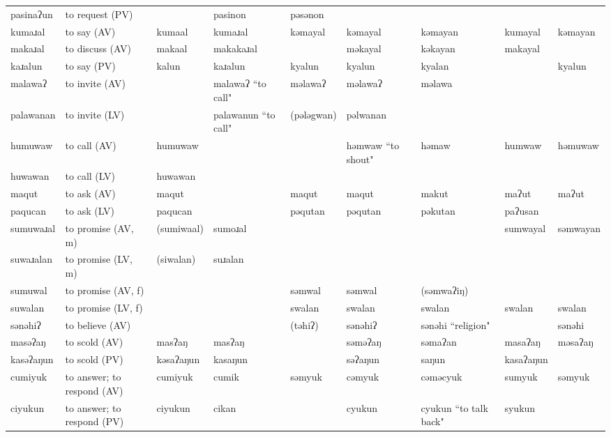 \begin{landscape}
\begin{longtable}{*{9}{>{\raggedright\arraybackslash}p{}}}
\text{*}pasinaʔun & to request (PV) &  & pasinon & pəsənon &  &  &  & \\
\text{*}kumaɹal & to say (AV) & kumaal & kumaɹal & kəmayal & kəmayal & kəmayan & kumayal & kəmayan\\
\text{*}makaɹal & to discuss (AV) & makaal & makakaɹal &  & məkayal & kəkayan & makayal & \\
\text{*}kaɹalun & to say (PV) & kalun & kaɹalun & kyalun & kyalun & kyalan &  & kyalun\\
\text{*}malawaʔ & to invite (AV) &  & malawaʔ \newline ``to call" & məlawaʔ & məlawaʔ & məlawa &  & \\
\text{*}palawanan & to invite (LV) &  & palawanun ``to call" & (pələgwan) & pəlwanan &  &  & \\
\text{*}humuwaw & to call (AV) & humuwaw &  &  & həmwaw \newline ``to shout" & həmaw & humwaw & həmuwaw\\
\text{*}huwawan & to call (LV) & huwawan &  &  &  &  &  & \\
\text{*}maqut & to ask (AV) & maqut &  & maqut & maqut & makut & maʔut & maʔut\\
\text{*}paqucan & to ask (LV) & paqucan &  & pəqutan & pəqutan & pəkutan & paʔusan & \\
\text{*}sumuwaɹal & to promise (AV, m) & (sumiwaal) & sumoɹal &  &  &  & sumwayal & səmwayan\\
\text{*}suwaɹalan & to promise (LV, m) & (siwalan) & suɹalan &  &  &  &  & \\
\text{*}sumuwal & to promise (AV, f) &  &  & səmwal & səmwal & (səmwaʔiŋ) &  & \\
\text{*}suwalan & to promise (LV, f) &  &  & swalan & swalan & swalan & swalan & swalan\\
\text{*}sənəhiʔ & to believe (AV) &  &  & (təhiʔ) & sənəhiʔ & sənəhi \newline ``religion" &  & sənəhi\\
\text{*}masəʔaŋ & to scold (AV) & masʔaŋ & masʔaŋ &  & səməʔaŋ & səmaʔan & masaʔaŋ & məsaʔaŋ\\
\text{*}kasəʔaŋun & to scold (PV) & kəsaʔaŋun & kasaŋun &  & səʔaŋun & saŋun & kasaʔaŋun & \\
\text{*}cumiyuk & to answer; to respond (AV) & cumiyuk & cumik & səmyuk & cəmyuk & cəməcyuk & sumyuk & səmyuk\\
\text{*}ciyukun & to answer; to respond (PV) & ciyukun & cikan &  & cyukun & cyukun \newline ``to talk back" & syukun & \\

\end{longtable}
\end{landscape}
